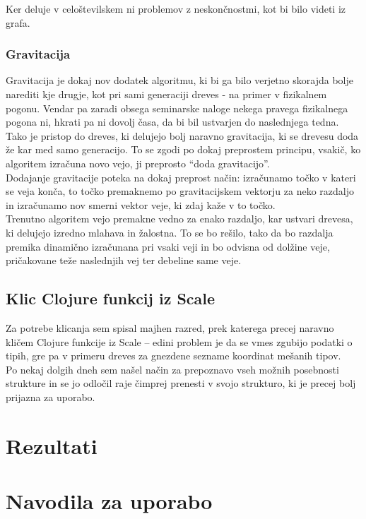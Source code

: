 \documentclass[10pt,a4paper,oneside]{book}
\def\pa{\\[-6pt]}
\begin{document}
Ker deluje v celoštevilskem ni problemov z neskončnostmi, kot bi bilo
videti iz grafa.

\subsection{Gravitacija}
Gravitacija je dokaj nov dodatek algoritmu, ki bi ga bilo verjetno
skorajda bolje narediti kje drugje, kot pri sami generaciji dreves -
na primer v fizikalnem pogonu. Vendar pa zaradi obsega seminarske
naloge nekega pravega fizikalnega pogona ni, hkrati pa ni dovolj časa,
da bi bil ustvarjen do naslednjega tedna.\pa

Tako je pristop do dreves, ki delujejo bolj naravno gravitacija, ki se
drevesu doda že kar med samo generacijo. To se zgodi po dokaj
preprostem principu, vsakič, ko algoritem izračuna novo vejo, ji
preprosto ``doda gravitacijo''.\pa

Dodajanje gravitacije poteka na dokaj preprost način: izračunamo točko
v kateri se veja konča, to točko premaknemo po gravitacijskem vektorju
za neko razdaljo in izračunamo nov smerni vektor veje, ki zdaj kaže v
to točko.\pa

Trenutno algoritem vejo premakne vedno za enako razdaljo, kar ustvari
drevesa, ki delujejo izredno mlahava in žalostna. To se bo rešilo,
tako da bo razdalja premika dinamično izračunana pri vsaki veji in bo
odvisna od dolžine veje, pričakovane teže naslednjih vej ter debeline
same veje.

\section{Klic Clojure funkcij iz Scale}
Za potrebe klicanja sem spisal majhen razred, prek katerega precej naravno kličem Clojure funkcije iz Scale -- edini problem je da se vmes zgubijo podatki o tipih, gre pa v primeru dreves za gnezdene sezname koordinat mešanih tipov.\pa

Po nekaj dolgih dneh sem našel način za prepoznavo vseh možnih posebnosti strukture in se jo odločil raje čimprej prenesti v svojo strukturo, ki je precej bolj prijazna za uporabo.

\chapter{Rezultati}


\chapter{Navodila za uporabo}
\end{document}
